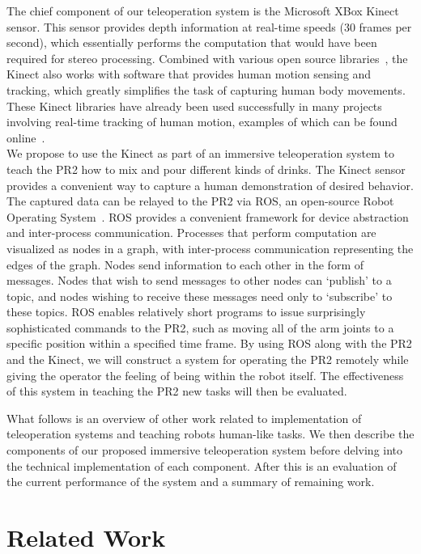 \documentclass{sig-alternate}
\begin{document}
\indent The chief component of our teleoperation system is the Microsoft XBox Kinect sensor. This sensor provides depth information at real-time speeds
(30 frames per second), which essentially performs the computation that would have been required for stereo 
processing. Combined with various open source libraries~\cite{kinect}, the Kinect also works with 
software that provides human motion sensing and tracking, which greatly simplifies the task of capturing human body movements.
These Kinect libraries have already been used successfully in 
many projects involving real-time tracking of human motion, examples of which can be found online~\cite{freenect}.\\
\indent We propose to use the Kinect as part of an immersive teleoperation system to teach the PR2 how to mix and pour different kinds of drinks.
The Kinect sensor provides a convenient way to capture a human demonstration of desired behavior. The captured data can be relayed to the
PR2 via ROS, an open-source Robot Operating System~\cite{ros}. ROS provides a 
convenient framework for device abstraction and inter-process communication. 
Processes that perform computation are visualized as nodes in a graph, with inter-process communication representing the
edges of the graph. Nodes send information to each other in the form of messages. Nodes that wish to send messages to other nodes can
`publish' to a topic, and nodes wishing to receive these messages need only to `subscribe' to these topics. ROS enables relatively short
programs to issue surprisingly sophisticated commands to the PR2, such as moving all of the arm joints to a specific position within a
specified time frame. By using ROS along with the PR2 and the Kinect, we will construct a system for operating the PR2 remotely while
giving the operator the feeling of being within the robot itself. The effectiveness of this system in teaching the PR2 new tasks will then be evaluated.

What follows is an overview of other work related to implementation of 
teleoperation systems and teaching robots human-like tasks. We then describe 
the components of our proposed immersive teleoperation system before delving 
into the technical implementation of each component. After this is an 
evaluation of the current performance of the system and a summary of remaining work.

\section{Related Work}
\label{sec:related_work}
\end{document}

